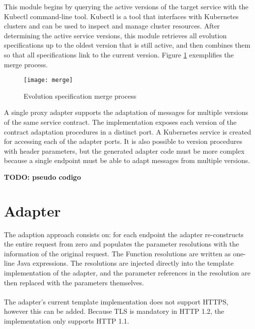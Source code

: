 This module begins by querying the active versions of the target service with the Kubectl command-line tool.
Kubectl is a tool that interfaces with Kubernetes clusters and can be used to inspect and manage cluster resources.
After determining the active service versions, this module retrieves all evolution specifications up to the oldest version that is still active,
and then combines them so that all specifications link to the current version. Figure \ref{fig:merge} exemplifies the merge process.

\begin{figure}[htbp]
    \centering
    \texttt{[image: merge]}
    \caption{Evolution specification merge process}
    \label{fig:merge}
\end{figure}

A single proxy adapter supports the adaptation of messages for multiple versions of the same service contract.
The implementation exposes each version of the contract adaptation procedures in a distinct port.
A Kubernetes service is created for accessing each of the adapter ports.
It is also possible to version procedures with header parameters,
but the generated adapter code must be more complex because a single endpoint must be able to adapt messages from multiple versions.

\textbf{TODO: pseudo codigo}

\section{Adapter} %
\label{sec:adapter}

The adaption approach consists on: for each endpoint the
adapter re-constructs the entire request from zero and populates the parameter resolutions with the information of the original request.
The {\selectfont  Function} resolutions are written as one-line Java expressions.
The resolutions are injected directly into the template implementation of the adapter, and the parameter references in the resolution are then replaced with the parameters themselves.

\paragraph{}

The adapter's current template implementation does not support HTTPS, however this can be added.
Because TLS is mandatory in HTTP 1.2, the implementation only supports HTTP 1.1.

